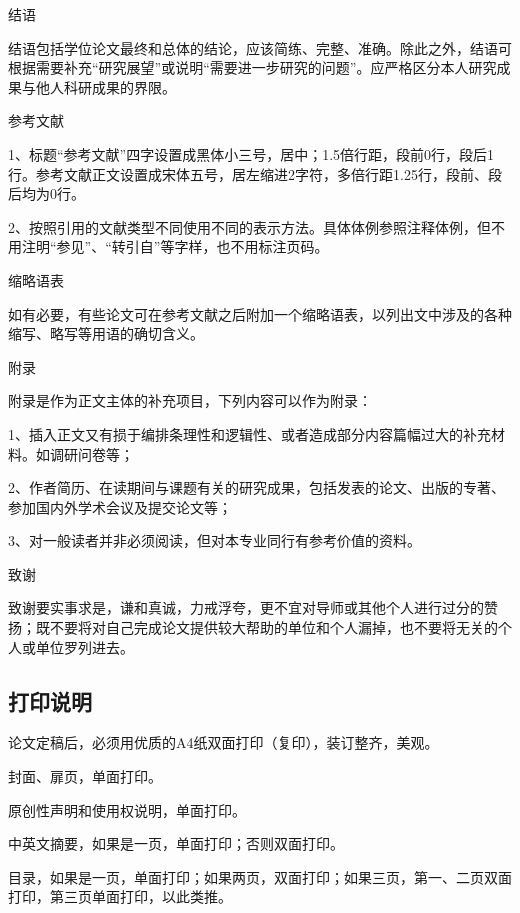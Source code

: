 \documentclass{hnuthesis}%
\begin{document}
\begin{asparaenum}
\item 结语

结语包括学位论文最终和总体的结论，应该简练、完整、准确。除此之外，结语可根据需要补充“研究展望”或说明“需要进一步研究的问题”。应严格区分本人研究成果与他人科研成果的界限。

\item 参考文献

1、标题“参考文献”四字设置成黑体小三号，居中；1.5倍行距，段前0行，段后1行。参考文献正文设置成宋体五号，居左缩进2字符，多倍行距1.25行，段前、段后均为0行。

2、按照引用的文献类型不同使用不同的表示方法。具体体例参照注释体例，但不用注明“参见”、“转引自”等字样，也不用标注页码。

\item 缩略语表

如有必要，有些论文可在参考文献之后附加一个缩略语表，以列出文中涉及的各种缩写、略写等用语的确切含义。

\item 附录

附录是作为正文主体的补充项目，下列内容可以作为附录：

1、插入正文又有损于编排条理性和逻辑性、或者造成部分内容篇幅过大的补充材料。如调研问卷等；

2、作者简历、在读期间与课题有关的研究成果，包括发表的论文、出版的专著、参加国内外学术会议及提交论文等；

3、对一般读者并非必须阅读，但对本专业同行有参考价值的资料。

\item 致谢

致谢要实事求是，谦和真诚，力戒浮夸，更不宜对导师或其他个人进行过分的赞扬；既不要将对自己完成论文提供较大帮助的单位和个人漏掉，也不要将无关的个人或单位罗列进去。

\end{asparaenum}


\subsection{打印说明}

论文定稿后，必须用优质的A4纸双面打印（复印），装订整齐，美观。

封面、扉页，单面打印。

原创性声明和使用权说明，单面打印。

中英文摘要，如果是一页，单面打印；否则双面打印。

目录，如果是一页，单面打印；如果两页，双面打印；如果三页，第一、二页双面打印，第三页单面打印，以此类推。
\end{document}
